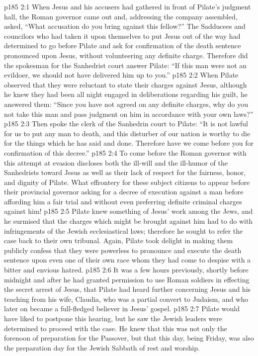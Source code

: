 \vs p185 2:1 When Jesus and his accusers had gathered in front of Pilate’s judgment hall, the Roman governor came out and, addressing the company assembled, asked, “What accusation do you bring against this fellow?” The Sadducees and councilors who had taken it upon themselves to put Jesus out of the way had determined to go before Pilate and ask for confirmation of the death sentence pronounced upon Jesus, without volunteering any definite charge. Therefore did the spokesman for the Sanhedrist court answer Pilate: “If this man were not an evildoer, we should not have delivered him up to you.”
\vs p185 2:2 When Pilate observed that they were reluctant to state their charges against Jesus, although he knew they had been all night engaged in deliberations regarding his guilt, he answered them: “Since you have not agreed on any definite charges, why do you not take this man and pass judgment on him in accordance with your own laws?”
\vs p185 2:3 Then spoke the clerk of the Sanhedrin court to Pilate: “It is not lawful for us to put any man to death, and this disturber of our nation is worthy to die for the things which he has said and done. Therefore have we come before you for confirmation of this decree.”
\vs p185 2:4 To come before the Roman governor with this attempt at evasion discloses both the ill\hyp{}will and the ill\hyp{}humor of the Sanhedrists toward Jesus as well as their lack of respect for the fairness, honor, and dignity of Pilate. What effrontery for these subject citizens to appear before their provincial governor asking for a decree of execution against a man before affording him a fair trial and without even preferring definite criminal charges against him!
\vs p185 2:5 Pilate knew something of Jesus’ work among the Jews, and he surmised that the charges which might be brought against him had to do with infringements of the Jewish ecclesiastical laws; therefore he sought to refer the case back to their own tribunal. Again, Pilate took delight in making them publicly confess that they were powerless to pronounce and execute the death sentence upon even one of their own race whom they had come to despise with a bitter and envious hatred.
\pc \vs p185 2:6 It was a few hours previously, shortly before midnight and after he had granted permission to use Roman soldiers in effecting the secret arrest of Jesus, that Pilate had heard further concerning Jesus and his teaching from his wife, Claudia, who was a partial convert to Judaism, and who later on became a full\hyp{}fledged believer in Jesus’ gospel.
\pc \vs p185 2:7 Pilate would have liked to postpone this hearing, but he saw the Jewish leaders were determined to proceed with the case. He knew that this was not only the forenoon of preparation for the Passover, but that this day, being Friday, was also the preparation day for the Jewish Sabbath of rest and worship.
